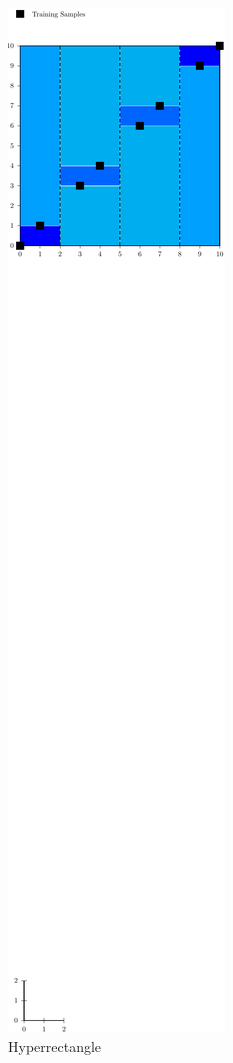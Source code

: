 \documentclass[11pt,onecolumn]{IEEEtran}
\begin{document}
  \begin{figure}[h!]
    \centering
    \includegraphics[scale=0.7]{image/rec.pdf} 
    \caption{Hyperrectangle}
    \label{fig:hyperrectangle}
    \end{figure}
\end{document}
